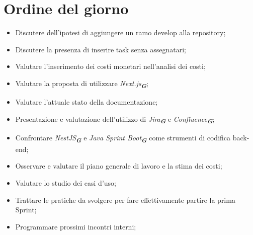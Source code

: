 

\section{Ordine del giorno}

\begin{itemize}
    \item Discutere dell'ipotesi di aggiungere un ramo develop alla repository;
    \item Discutere la presenza di inserire task senza assegnatari;
    \item Valutare l'inserimento dei costi monetari nell'analisi dei costi;
    \item Valutare la proposta di utilizzare \emph{Next.js}\textsubscript{\textit{\textbf{G}}};
    \item Valutare l'attuale stato della documentazione;
    \item Presentazione e valutazione dell'utilizzo di \emph{Jira}\textsubscript{\textit{\textbf{G}}} e \emph{Confluence}\textsubscript{\textit{\textbf{G}}};
    \item Confrontare \emph{NestJS}\textsubscript{\textit{\textbf{G}}} e \emph{Java Sprint Boot}\textsubscript{\textit{\textbf{G}}} come strumenti di codifica back-end;
    \item Osservare e valutare il piano generale di lavoro e la stima dei costi;
    \item Valutare lo studio dei casi d'uso;
    \item Trattare le pratiche da svolgere per fare effettivamente partire la prima Sprint;
    \item Programmare prossimi incontri interni;




\end{itemize}
